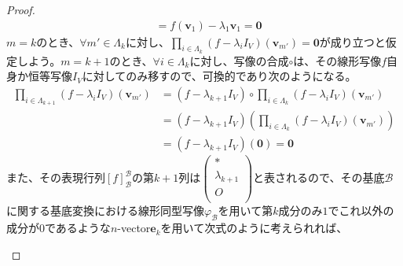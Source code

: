 \documentclass[dvipdfmx]{jsarticle}
\begin{document}
\begin{proof}
\begin{align*}
&= f\left( \mathbf{v}_{1} \right) - \lambda_{1}\mathbf{v}_{1} = \mathbf{0}
\end{align*}
$m = k$のとき、$\forall m' \in \varLambda_{k}$に対し、$\prod_{i \in \varLambda_{k}} \left( f - \lambda_{i}I_{V} \right)\left( \mathbf{v}_{m'} \right) = \mathbf{0}$が成り立つと仮定しよう。$m = k + 1$のとき、$\forall i \in \varLambda_{k}$に対し、写像の合成$\circ$は、その線形写像$f$自身か恒等写像$I_{V}$に対してのみ移すので、可換的であり次のようになる。
\begin{align*}
\prod_{i \in \varLambda_{k + 1}} \left( f - \lambda_{i}I_{V} \right)\left( \mathbf{v}_{m'} \right) &= \left( f - \lambda_{k + 1}I_{V} \right) \circ \prod_{i \in \varLambda_{k}} \left( f - \lambda_{i}I_{V} \right)\left( \mathbf{v}_{m'} \right)\\
&= \left( f - \lambda_{k + 1}I_{V} \right)\left( \prod_{i \in \varLambda_{k}} \left( f - \lambda_{i}I_{V} \right)\left( \mathbf{v}_{m'} \right) \right)\\
&= \left( f - \lambda_{k + 1}I_{V} \right)\left( \mathbf{0} \right) = \mathbf{0}
\end{align*}
また、その表現行列$[ f]_{\mathcal{B}}^{\mathcal{B}}$の第$k + 1$列は$\begin{pmatrix}
* \\
\lambda_{k + 1} \\
O \\
\end{pmatrix}$と表されるので、その基底$\mathcal{B}$に関する基底変換における線形同型写像$\varphi_{\mathcal{B}}$を用いて第$k$成分のみ$1$でこれ以外の成分が$0$であるような$n$-vector$\mathbf{e}_{k}$を用いて次式のように考えられれば、
\begin{center}
\end{center}
\end{proof}
\end{document}
